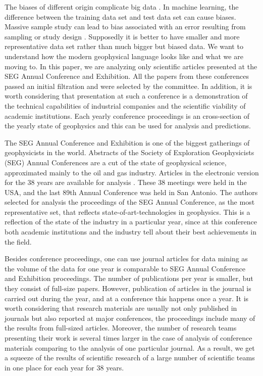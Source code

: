 \documentclass[geosciences,article,submit,moreauthors,pdftex]{Definitions/mdpi}
\begin{document}
The biases of different origin complicate big data \citep{Glauner2018}. In machine learning, the difference between the training data set and test data set can cause biases. Massive sample study can lead to bias associated with an error resulting from sampling or study design \citep{Kaplan2014}. Supposedly it is better to have smaller and more representative data set rather than much bigger but biased data. We want to understand how the modern geophysical language looks like and what we are moving to. In this paper, we are analyzing only scientific articles presented at the SEG  Annual Conference and Exhibition. All the papers from these conferences passed an initial filtration and were selected by the committee. In addition, it is worth considering that presentation at such a conference is a demonstration of the technical capabilities of industrial companies and the scientific viability of academic institutions. Each yearly conference proceedings is an cross-section of the yearly state of geophysics and this can be used for analysis and predictions.

The SEG Annual Conference and Exhibition is one of the biggest gatherings of geophysicists in the world. Abstracts of the Society of Exploration Geophysicists (SEG) Annual Conferences are a cut of the state of geophysical science, approximated mainly to the oil and gas industry. Articles in the electronic version for the 38 years are available for analysis \citep{SEG}. These 38 meetings were held in the USA, and the last 89th Annual Conference was held in San Antonio. The authors selected for analysis the proceedings of the SEG Annual Conference, as the most representative set, that reflects state-of-art-technologies in geophysics. This is a reflection of the state of the industry in a particular year, since at this conference both academic institutions and the industry tell about their best achievements in the field.

Besides conference proceedings, one can use journal articles for data mining as the volume of the data for one year is comparable to SEG Annual Conference and Exhibition proceedings. The number of publications per year is smaller, but they consist of full-size papers. However, publication of articles in the journal is carried out during the year, and at a conference this happens once a year. It is worth considering that research materials are usually not only published in journals but also reported at major conferences, the proceedings include many of the results from full-sized articles. Moreover, the number of research teams presenting their work is several times larger in the case of analysis of conference materials comparing to the analysis of one particular journal. As a result, we get a squeeze of the results of scientific research of a large number of scientific teams in one place for each year for 38 years.
\end{document}
